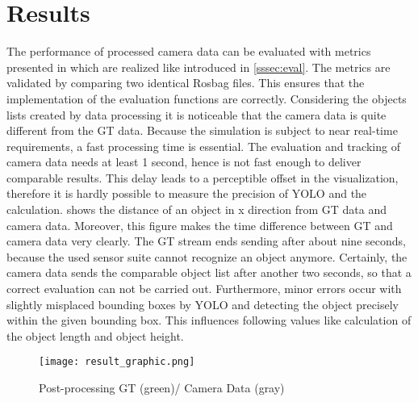 \section{Results}\label{Results}
	
	The performance of processed camera data can be evaluated with metrics presented in \cite{Reway} which are realized like introduced in \cref{sssec:eval}. The metrics are validated by comparing two identical Rosbag files. This ensures that the implementation of the evaluation functions are correctly.
	Considering the objects lists created by data processing it is noticeable that the camera data is quite different from the \ac{GT} data. Because the simulation is subject to near real-time requirements, a fast processing time is essential. The evaluation and tracking of camera data needs at least 1 second, hence is not fast enough to deliver comparable results. This delay leads to a perceptible offset in the visualization, therefore it is hardly possible to measure the precision of \ac{YOLO} and the calculation.
	 shows the distance of an object in x direction from \ac{GT} data and camera data. Moreover, this figure  makes the time difference between \ac{GT} and camera data very clearly. The \ac{GT} stream ends sending after about nine seconds, because the used sensor suite cannot recognize an object anymore. Certainly, the camera data  sends the comparable object list after another two seconds, so that a correct evaluation can not be carried out. Furthermore, minor errors occur with slightly misplaced bounding boxes by \ac{YOLO} and detecting the object precisely within the given bounding box. This influences following values like calculation of the object length and object height.\\
	
	\begin{figure}[b]
		\centering
		\texttt{[image: result\_graphic.png]}
		\caption{Post-processing GT (green)/ Camera Data (gray)}
		\label{fig:result}
	\end{figure}
%	
